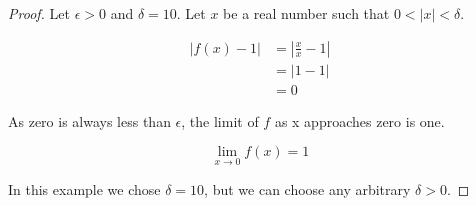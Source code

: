\documentclass{article}
\begin{document}
\begin{proof}
Let $\epsilon > 0$ and $\delta = 10$. Let $x$ be a real number such that $0 < |x| < \delta$.

\begin{align*}
|f(x) - 1| &= |\frac{x}{x} - 1| \\
&= |1 - 1| \\
&= 0
\end{align*}

As zero is always less than $\epsilon$, the limit of $f$ as x approaches zero is one.

\begin{equation*}
\lim_{x \to 0} f(x) = 1
\end{equation*}

In this example we chose $\delta = 10$, but we can choose any arbitrary $\delta > 0$.

\end{proof}
\end{document}
